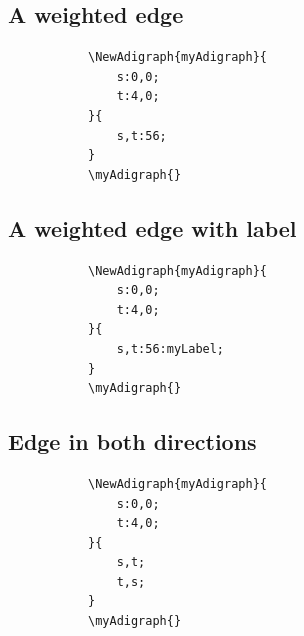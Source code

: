 \documentclass{report}
\begin{document}
\subsection{A weighted edge}
\begin{figure}
	\begin{subfigure}{0.49\textwidth}
		\begin{verbatim}
\NewAdigraph{myAdigraph}{
 	s:0,0;
 	t:4,0;
}{
	s,t:56;
}
\myAdigraph{}
\end{verbatim}
	\end{subfigure}
	\begin{subfigure}{0.49\textwidth}
		\myAdigraph{}
	\end{subfigure}
\end{figure}

\subsection{A weighted edge with label}
\begin{figure}
	\begin{subfigure}{0.49\textwidth}
		\begin{verbatim}
\NewAdigraph{myAdigraph}{
 	s:0,0;
 	t:4,0;
}{
	s,t:56:myLabel;
}
\myAdigraph{}
\end{verbatim}
	\end{subfigure}
	\begin{subfigure}{0.49\textwidth}
		\myAdigraph{}
	\end{subfigure}
\end{figure}

\subsection{Edge in both directions}
\begin{figure}
	\begin{subfigure}{0.49\textwidth}
		\begin{verbatim}
\NewAdigraph{myAdigraph}{
 	s:0,0;
 	t:4,0;
}{
	s,t;
	t,s;
}
\myAdigraph{}
\end{verbatim}
	\end{subfigure}
	\begin{subfigure}{0.49\textwidth}
		\myAdigraph{}
	\end{subfigure}
\end{figure}
\end{document}
